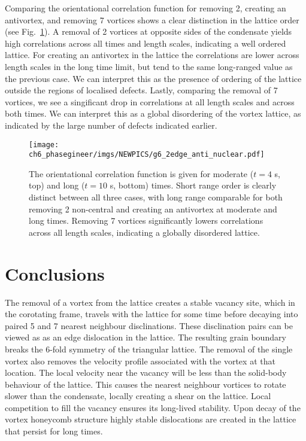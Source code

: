 Comparing the orientational correlation function for removing 2, creating an antivortex, and removing 7 vortices shows a clear distinction in the lattice order (see Fig.~\ref{fig:g6_2edge_anti_nuclear}). A removal of 2 vortices at opposite sides of the condensate yields high correlations across all times and length scales, indicating a well ordered lattice. For creating an antivortex in the lattice the correlations are lower across length scales in the long time limit, but tend to the same long-ranged value as the previous case. We can interpret this as the presence of ordering of the lattice outside the regions of localised defects. Lastly, comparing the removal of 7 vortices, we see a singificant drop in correlations at all length scales and across both times. We can interpret this as a global disordering of the vortex lattice, as indicated by the large number of defects indicated earlier.

\begin{figure} \centering
    \texttt{[image: ch6\_phasegineer/imgs/NEWPICS/g6\_2edge\_anti\_nuclear.pdf]}
    \caption{The orientational correlation function is given for moderate ($t=4$ s, top) and long ($t=10$ s, bottom) times. Short range order is clearly distinct between all three cases, with long range comparable for both removing 2 non-central and creating an antivortex at moderate and long times. Removing 7 vortices significantly lowers correlations across all length scales, indicating a globally disordered lattice.}\label{fig:g6_2edge_anti_nuclear}
\end{figure}

\section{Conclusions}\label{sec:Conclusions}

The removal of a vortex from the lattice creates a stable vacancy site, which in the corotating frame, travels with the lattice for some time before decaying into paired 5 and 7 nearest neighbour disclinations. These disclination pairs can be viewed as as an edge dislocation in the lattice. The resulting grain boundary breaks the 6-fold symmetry of the triangular lattice. The removal of the single vortex also removes the velocity profile associated with the vortex at that location. The local velocity near the vacancy will be less than the solid-body behaviour of the lattice. This causes the nearest neighbour vortices to rotate slower than the condensate, locally creating a shear on the lattice. Local competition to fill the vacancy ensures its long-lived stability. Upon decay of the vortex honeycomb structure highly stable dislocations are created in the lattice that persist for long times.

